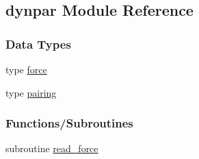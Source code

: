 \hypertarget{namespacedynpar}{}\subsection{dynpar Module Reference}
\label{namespacedynpar}
\subsubsection*{Data Types}
\begin{DoxyCompactItemize}
\item 
type \hyperlink{structdynpar_1_1force}{force}
\item 
type \hyperlink{structdynpar_1_1pairing}{pairing}
\end{DoxyCompactItemize}
\subsubsection*{Functions/\+Subroutines}
\begin{DoxyCompactItemize}
\item 
subroutine \hyperlink{namespacedynpar_a55a0eb741c14d718ba58a4ee5c77ff2a}{read\+\_\+force}
\end{DoxyCompactItemize}
